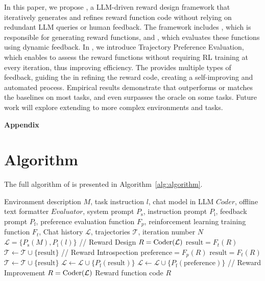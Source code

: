 \documentclass{article}
\theoremstyle{plain}
\theoremstyle{definition}
\theoremstyle{remark}
\begin{document}
In this paper, we propose \ourmethod, a LLM-driven reward design framework that iteratively generates and refines reward function code without relying on redundant LLM queries or human feedback. The framework includes \designer, which is responsible for generating reward functions, and \critic, which evaluates these functions using dynamic feedback. In \ourmethod, we introduce Trajectory Preference Evaluation, which enables \critic to assess the reward functions without requiring RL training at every iteration, thus improving efficiency. The \critic provides multiple types of feedback, guiding the \designer in refining the reward code, creating a self-improving and automated process. Empirical results demonstrate that \ourmethod outperforms or matches the baselines on most tasks, and even surpasses the oracle on some tasks. Future work will explore extending \ourmethod to more complex environments and tasks.






\clearpage

\appendix


{\centering \LARGE \textbf{Appendix}\par}


\section{Algorithm}\label{app:full_algorithm}

The full algorithm of \ourmethod is presented in Algorithm~\ref{alg:algorithm}.

\begin{algorithm}[!htbp]
\caption{\ourmethod}
\label{alg:algorithm}
\begin{algorithmic}[1] %
\Require Environment description $M$, task instruction $l$, chat model in LLM $Coder$, offline text formatter $Evaluator$, system prompt $P_{\text{s}}$, instruction prompt $P_{\text{i}}$, feedback prompt $P_{\text{f}}$, preference evaluation function $F_p$, reinforcement learning training function $F_t$, Chat history $\mathcal{L}$, trajectories $\mathcal{T}$, iteration number $N$
\State $\mathcal{L}=\{P_{\text{s}}(M), P_{\text{i}}(l)\}$
\State // Reward Design
\State $R=\text{Coder}(\mathcal{L})$
\State $\text{result}=F_t(R)$
\State $\mathcal{T} \leftarrow \mathcal{T} \cup \{\text{result}\}$
\State // Reward Introspection
\State $\text{preference}=F_p(R)$
\State $\text{result}=F_t(R)$
\State $\mathcal{T} \leftarrow \mathcal{T} \cup \{\text{result}\}$
\State $\mathcal{L} \leftarrow \mathcal{L} \cup \{P_{\text{f}}(\text{result})\}$
\Else
\State $\mathcal{L} \leftarrow \mathcal{L} \cup \{P_{\text{f}}(\text{preference})\}$
\EndIf
\State // Reward Improvement
\State $R=\text{Coder}(\mathcal{L})$
\EndFor
\Ensure Reward function code $R$
\end{algorithmic}
\end{algorithm}
\end{document}
